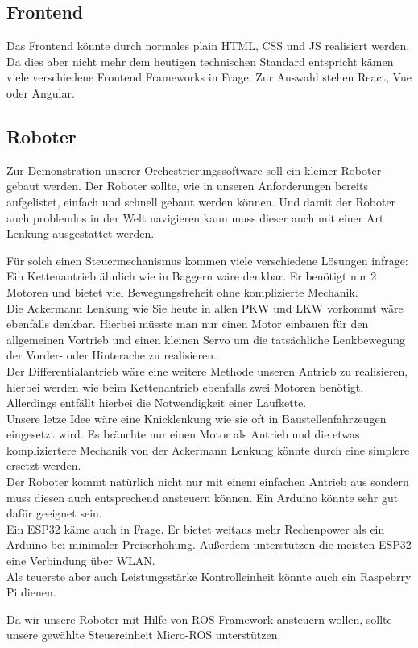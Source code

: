 \subsection{Frontend}
    Das Frontend könnte durch normales plain HTML, CSS und JS realisiert werden. 
    Da dies aber nicht mehr dem heutigen technischen Standard entspricht kämen viele verschiedene Frontend Frameworks in Frage.
    Zur Auswahl stehen React, Vue oder Angular.

\subsection{Roboter}
    Zur Demonstration unserer Orchestrierungssoftware soll ein kleiner Roboter gebaut werden.
    Der Roboter sollte, wie in unseren Anforderungen bereits aufgelistet, einfach und schnell gebaut werden können.
    Und damit der Roboter auch problemlos in der Welt navigieren kann muss dieser auch mit einer Art Lenkung ausgestattet werden.

    Für solch einen Steuermechanismus kommen viele verschiedene Lösungen infrage:
    \\
    Ein Kettenantrieb ähnlich wie in Baggern wäre denkbar. Er benötigt nur 2 Motoren und bietet viel Bewegungsfreheit ohne komplizierte Mechanik. 
    \\
    Die Ackermann Lenkung wie Sie heute in allen PKW und LKW vorkommt wäre ebenfalls denkbar. Hierbei müsste man 
    nur einen Motor einbauen für den allgemeinen Vortrieb und einen kleinen Servo um die tatsächliche Lenkbewegung der
    Vorder- oder Hinterache zu realisieren. 
    \\
    Der Differentialantrieb wäre eine weitere Methode unseren Antrieb zu realisieren, hierbei werden wie beim Kettenantrieb
    ebenfalls zwei Motoren benötigt. Allerdings entfällt hierbei die Notwendigkeit einer Laufkette.
    \\
    Unsere letze Idee wäre eine Knicklenkung wie sie oft in Baustellenfahrzeugen eingesetzt wird. Es bräuchte nur einen Motor
    als Antrieb und die etwas kompliziertere Mechanik von der Ackermann Lenkung könnte durch eine simplere ersetzt werden.
    \\

    Der Roboter kommt natürlich nicht nur mit einem einfachen Antrieb aus sondern muss diesen auch entsprechend 
    ansteuern können.
    Ein Arduino könnte sehr gut dafür geeignet sein.
    \\
    Ein ESP32 käme auch in Frage. Er bietet weitaus mehr Rechenpower als ein Arduino bei minimaler Preiserhöhung.
    Außerdem unterstützen die meisten ESP32 eine Verbindung über WLAN.
    \\
    Als teuerste aber auch Leistungsstärke Kontrolleinheit könnte auch ein Raspebrry Pi dienen.
    
    Da wir unsere Roboter mit Hilfe von ROS Framework ansteuern wollen, sollte unsere gewählte Steuereinheit Micro-ROS unterstützen.